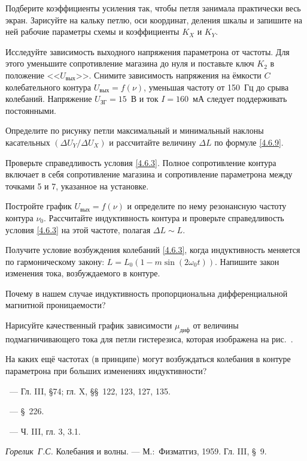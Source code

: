 \begin{lab:task}
Подберите коэффициенты усиления так, чтобы петля занимала практически весь
экран. Зарисуйте на кальку петлю, оси координат, деления шкалы и запишите на ней
рабочие параметры схемы и коэффициенты $K_X$ и $K_Y$.

\item Исследуйте зависимость выходного напряжения параметрона от частоты. Для
этого уменьшите сопротивление магазина до нуля и поставьте ключ $K_2$ в
положение <<$U_\text{вых}$>>. Снимите зависимость напряжения на ёмкости $C$
колебательного контура $U_\text{вых} = f(\nu)$, уменьшая частоту от 150~Гц до
срыва колебаний. Напряжение $U_\text{ЗГ} = 15$~В и ток $I = 160$~мА следует
поддерживать постоянными.


\item
Определите по рисунку петли максимальный и минимальный наклоны касательных
$(\Delta U_Y/ \Delta U_X)$ и рассчитайте величину $\Delta L$ по формуле
\eqref{4.6.9}.

Проверьте справедливость условия \eqref{4.6.3}. Полное сопротивление контура
включает в себя сопротивление магазина и сопротивление параметрона между точками
5 и 7, указанное на установке.

\item
Постройте график $U_\text{вых} = f(\nu)$ и определите по нему резонансную
частоту контура $\nu_0$. Рассчитайте индуктивность контура
и проверьте справедливость условия \eqref{4.6.3} на
этой частоте, полагая $\Delta L \sim L$.

\end{lab:task}


\begin{lab:questions}
\item
Получите условие возбуждения колебаний \eqref{4.6.3}, когда индуктивность
меняется по гармоническому закону: $L = L_0(1-m\sin(2\omega_0t))$. Напишите закон
изменения тока, возбуждаемого в контуре.

\item
Почему в нашем случае индуктивность пропорциональна дифференциальной магнитной
проницаемости?

\item
Нарисуйте качественный график зависимости $\mu_\text{диф}$ от величины
подмагничивающего тока для петли гистерезиса, которая изображена на
рис.~.

\item
На каких ещё частотах (в принципе) могут возбуждаться колебания в контуре
параметрона при больших изменениях индуктивности?
\end{lab:questions}


\begin{lab:literature}
\item
\SivuhinIII~--- Гл. III, \S 74; гл. X, \S\S~122, 123, 127, 135.

\item
\Kalashnikov~--- \S~226.

\item
\KingLokOlh~--- Ч. III, гл. 3, 3.1.

\item
\textit{Горелик~Г.С.} Колебания и волны. --- М.:~Физматгиз, 1959. Гл. III, \S~9.

\end{lab:literature}

